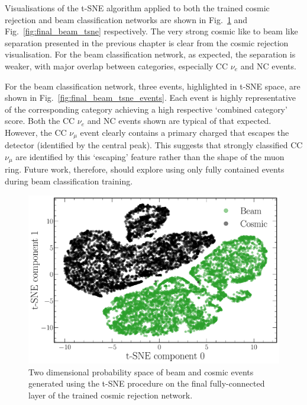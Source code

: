 Visualisations of the t-SNE algorithm applied to both the trained cosmic rejection and beam
classification networks are shown in Fig.~\ref{fig:final_cosmic_tsne} and
Fig.~\ref{fig:final_beam_tsne} respectively. The very strong cosmic like to beam like separation
presented in the previous chapter is clear from the cosmic rejection visualisation. For the beam
classification network, as expected, the separation is weaker, with major overlap between
categories, especially CC $\nu_{e}$ and NC events.

For the beam classification network, three events, highlighted in t-SNE space, are shown in
Fig.~\ref{fig:final_beam_tsne_events}. Each event is highly representative of the corresponding
category achieving a high respective `combined category' score. Both the CC $\nu_{e}$ and NC
events shown are typical of that expected. However, the CC $\nu_{\mu}$ event clearly contains a
primary charged that escapes the detector (identified by the central peak). This suggests that
strongly classified CC $\nu_{\mu}$ are identified by this `escaping' feature rather than the shape
of the muon ring. Future work, therefore, should explore using only fully contained events during
beam classification training.

\begin{figure} %
    \includegraphics[width=\textwidth]{diagrams/6-cvn/chipsnet/final_cosmic_tsne.pdf}
    \caption[Cosmic rejection network t-SNE space.]
    {Two dimensional probability space of beam and cosmic events generated using the t-SNE
        procedure on the final fully-connected layer of the trained cosmic rejection network.}
    \label{fig:final_cosmic_tsne}
\end{figure}

